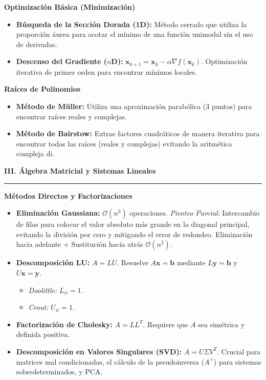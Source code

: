 \documentclass[10pt, landscape, twocolumn]{article}
\newcommand{\cheatsheetsection}[1]{
    \vspace{0.6em}
    {\color{themeblue}\large\bfseries #1} \par
    \vspace{-0.5em}
    {\color{themeblue}\rule{\linewidth}{1pt}} \par
    \vspace{0.2em}
}
\newcommand{\cheatsheetsubsection}[1]{
    \vspace{0.4em}
    {\color{themeblue}\normalsize\bfseries #1} \par
    \vspace{0.1em}
}
\begin{document}
\cheatsheetsubsection{Optimización Básica (Minimización)}
\begin{itemize}[leftmargin=*, nosep]
    \item \textbf{Búsqueda de la Sección Dorada (1D):} Método cerrado que utiliza la proporción áurea para acotar el mínimo de una función unimodal sin el uso de derivadas.
    \item \textbf{Descenso del Gradiente ($n$D):} $\mathbf{x}_{k+1} = \mathbf{x}_k - \alpha \nabla f(\mathbf{x}_k)$. Optimización iterativa de primer orden para encontrar mínimos locales.
\end{itemize}

\cheatsheetsubsection{Raíces de Polinomios}
\begin{itemize}[leftmargin=*, nosep]
    \item \textbf{Método de Müller:} Utiliza una aproximación parabólica (3 puntos) para encontrar raíces reales y complejas.
    \item \textbf{Método de Bairstow:} Extrae factores cuadráticos de manera iterativa para encontrar todas las raíces (reales y complejas) evitando la aritmética compleja di.
\end{itemize}

\cheatsheetsection{III. Álgebra Matricial y Sistemas Lineales}

\cheatsheetsubsection{Métodos Directos y Factorizaciones}
\begin{itemize}[leftmargin=*, nosep]
    \item \textbf{Eliminación Gaussiana:} $\mathcal{O}(n^3)$ operaciones. 
    \textit{Pivoteo Parcial:} Intercambio de filas para colocar el valor absoluto más grande en la diagonal principal, evitando la división por cero y mitigando el error de redondeo. Eliminación hacia adelante + Sustitución hacia atrás $\mathcal{O}(n^2)$.
    \item \textbf{Descomposición LU:} $A = LU$. Resuelve $A\mathbf{x} = \mathbf{b}$ mediante $L\mathbf{y} = \mathbf{b}$ y $U\mathbf{x} = \mathbf{y}$.
    \begin{itemize}[leftmargin=*, nosep]
        \item \textit{Doolittle:} $L_{ii} = 1$.
        \item \textit{Crout:} $U_{ii} = 1$.
    \end{itemize}
    \item \textbf{Factorización de Cholesky:} $A = LL^T$. Requiere que $A$ sea simétrica y definida positiva.
    \item \textbf{Descomposición en Valores Singulares (SVD):} $A = U \Sigma V^T$. Crucial para matrices mal condicionadas, el cálculo de la pseudoinversa ($A^+$) para sistemas sobredeterminados, y PCA.
\end{itemize}
\end{document}
